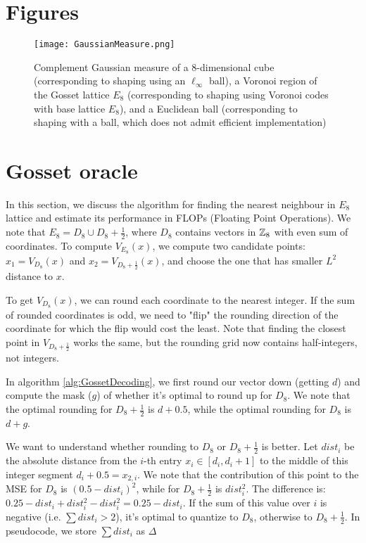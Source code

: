 \newpage
\appendix
\onecolumn


\section{Figures}

\begin{figure}[h]
  \centering    \texttt{[image: GaussianMeasure.png]}
  \caption{Complement Gaussian measure of a $8$-dimensional cube (corresponding to shaping using an $\ell_{\infty}$ ball), a Voronoi region of the Gosset lattice $E_8$ (corresponding to shaping using Voronoi codes with base lattice $E_8$), and a Euclidean ball (corresponding to shaping with a ball, which does not admit efficient implementation) }
  \label{fig:GaussMeasure}
\end{figure}

\section{Gosset oracle}
\label{sec:oracle}
In this section, we discuss the algorithm for finding the nearest neighbour in $E_8$ lattice and estimate its performance in FLOPs (Floating Point Operations). We note that $E_8 = D_8 \cup D_8 + \frac{1}{2}$, where $D_8$ contains vectors in $\mathbb{Z}_8$ with even sum of coordinates. To compute $V_{E_8}(x)$, we compute two candidate points: $x_1 = V_{D_8}(x)$ and $x_2 = V_{D_8 + \frac{1}{2}}(x)$, and choose the one that has smaller $L^2$ distance to $x$.

To get $V_{D_8}(x)$, we can round each coordinate to the nearest integer. If the sum of rounded coordinates is odd, we need to "flip" the rounding direction of the coordinate for which the flip would cost the least. Note that finding the closest point in $V_{D_8 + \frac{1}{2}}$ works the same, but the rounding grid now contains half-integers, not integers.

In algorithm \ref{alg:GossetDecoding}, we first round our vector down (getting $d$) and compute the mask ($g$) of whether it's optimal to round up for $D_8$. We note that the optimal rounding for $D_8 + \frac{1}{2}$ is $d + 0.5$, while the optimal rounding for $D_8$ is $d + g$. 

We want to understand whether rounding to $D_8$ or $D_8 + \frac{1}{2}$ is better. Let $dist_i$ be the absolute distance from the $i$-th entry $x_i \in [d_i, d_i+1]$ to the middle of this integer segment $d_i + 0.5 = x_{2, i}$. We note that the contribution of this point to the MSE for $D_8$ is $(0.5-dist_i)^2$, while for $D_8+\frac{1}{2}$ is $dist_i^2$. The difference is: $0.25 - dist_i + dist_i^2 - dist_i^2 = 0.25 - dist_i$. If the sum of this value over $i$ is negative (i.e. $\sum dist_i > 2$), it's optimal to quantize to $D_8$, otherwise to $D_8 + \frac{1}{2}$. In pseudocode, we store $\sum dist_i$ as $\Delta$

